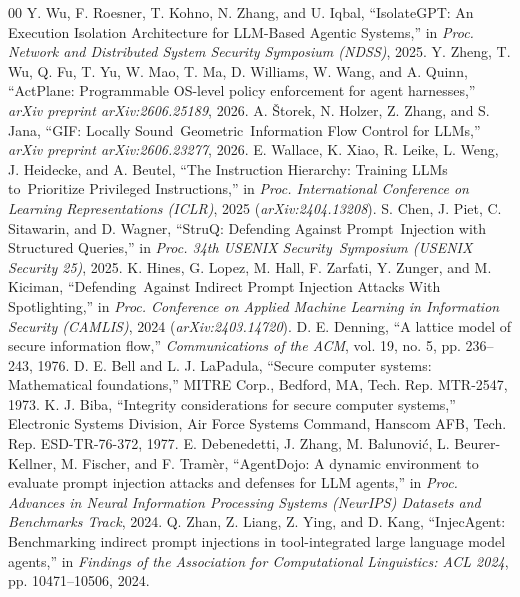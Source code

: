 \documentclass[conference,10pt]{IEEEtran}
\begin{document}
\begin{thebibliography}{00}
 Y. Wu, F. Roesner, T. Kohno, N. Zhang, and U. Iqbal, ``IsolateGPT: An Execution Isolation Architecture for LLM-Based Agentic Systems,'' in \textit{Proc. Network and Distributed System Security Symposium (NDSS)}, 2025.
 Y. Zheng, T. Wu, Q. Fu, T. Yu, W. Mao, T. Ma, D. Williams, W. Wang, and A. Quinn, ``ActPlane: Programmable OS-level policy enforcement for agent harnesses,'' \textit{arXiv preprint arXiv:2606.25189}, 2026.
 A. {\v{S}}torek, N. Holzer, Z. Zhang, and S. Jana, ``GIF: Locally Sound\allowbreak\ Geometric\allowbreak\ Information Flow Control for LLMs,'' \textit{arXiv preprint arXiv:2606.23277}, 2026.
 E. Wallace, K. Xiao, R. Leike, L. Weng, J. Heidecke, and A. Beutel, ``The Instruction Hierarchy: Training LLMs to\allowbreak\ Prioritize Privileged Instructions,'' in \textit{Proc. International Conference on Learning Representations (ICLR)}, 2025 (\textit{arXiv:2404.13208}).
 S. Chen, J. Piet, C. Sitawarin, and D. Wagner, ``StruQ: Defending Against Prompt\allowbreak\ Injection with Structured Queries,'' in \textit{Proc. 34th USENIX Security\allowbreak\ Symposium (USENIX Security 25)}, 2025.
 K. Hines, G. Lopez, M. Hall, F. Zarfati, Y. Zunger, and M. Kiciman, ``Defending\allowbreak\ Against Indirect Prompt Injection Attacks With Spotlighting,'' in \textit{Proc. Conference on Applied Machine Learning in Information Security (CAMLIS)}, 2024 (\textit{arXiv:2403.14720}).
 D. E. Denning, ``A lattice model of secure information flow,'' \textit{Communications of the ACM}, vol. 19, no. 5, pp. 236--243, 1976.
 D. E. Bell and L. J. LaPadula, ``Secure computer systems: Mathematical foundations,'' MITRE Corp., Bedford, MA, Tech. Rep. MTR-2547, 1973.
 K. J. Biba, ``Integrity considerations for secure computer systems,'' Electronic Systems Division, Air Force Systems Command, Hanscom AFB, Tech. Rep. ESD-TR-76-372, 1977.
 E. Debenedetti, J. Zhang, M. {\selectfont Balunovi{\'c}}, L. Beurer-Kellner, M. Fischer, and F. Tram{\`e}r, ``AgentDojo: A dynamic environment to evaluate prompt injection attacks and defenses for LLM agents,'' in \textit{Proc. Advances in Neural Information Processing Systems (NeurIPS) Datasets and Benchmarks Track}, 2024.
 Q. Zhan, Z. Liang, Z. Ying, and D. Kang, ``InjecAgent: Benchmarking indirect prompt injections in tool-integrated large language model agents,'' in \textit{Findings of the Association for Computational Linguistics: ACL 2024}, pp. 10471--10506, 2024.

\end{thebibliography}
\end{document}
